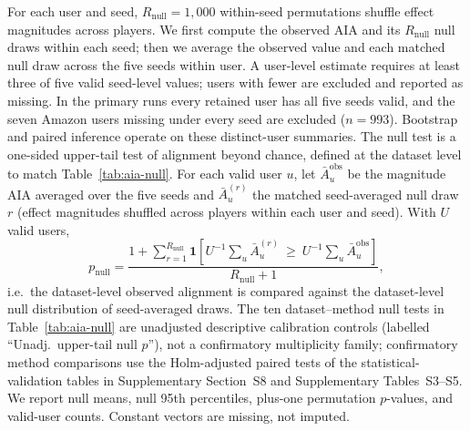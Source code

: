 \documentclass[manuscript,screen,review,anonymous]{acmart}
\begin{document}
For each user and seed, $R_{\mathrm{null}}=1{,}000$ within-seed permutations shuffle effect magnitudes across players. We first compute the observed AIA and its $R_{\mathrm{null}}$ null draws within each seed; then we average the observed value and each matched null draw across the five seeds within user. A user-level estimate requires at least three of five valid seed-level values; users with fewer are excluded and reported as missing. In the primary runs every retained user has all five seeds valid, and the seven Amazon users missing under every seed are excluded ($n=993$). Bootstrap and paired inference operate on these distinct-user summaries. The null test is a one-sided upper-tail test of alignment beyond chance, defined at the dataset level to match Table~\ref{tab:aia-null}. For each valid user $u$, let $\bar A_u^{\mathrm{obs}}$ be the magnitude AIA averaged over the five seeds and $\bar A_u^{(r)}$ the matched seed-averaged null draw $r$ (effect magnitudes shuffled across players within each user and seed). With $U$ valid users,
\begin{equation}
p_{\mathrm{null}}=
\frac{1+\sum_{r=1}^{R_{\mathrm{null}}}\mathbf{1}\left[U^{-1}\textstyle\sum_u \bar A_u^{(r)}\ \ge\ U^{-1}\textstyle\sum_u \bar A_u^{\mathrm{obs}}\right]}{R_{\mathrm{null}}+1},
\label{eq:null-p}
\end{equation}
i.e.\ the dataset-level observed alignment is compared against the dataset-level null distribution of seed-averaged draws. The ten dataset--method null tests in Table~\ref{tab:aia-null} are unadjusted descriptive calibration controls (labelled ``Unadj.\ upper-tail null $p$''), not a confirmatory multiplicity family; confirmatory method comparisons use the Holm-adjusted paired tests of the statistical-validation tables in Supplementary Section~S8 and Supplementary Tables~S3--S5. We report null means, null 95th percentiles, plus-one permutation $p$-values, and valid-user counts. Constant vectors are missing, not imputed.
\end{document}

